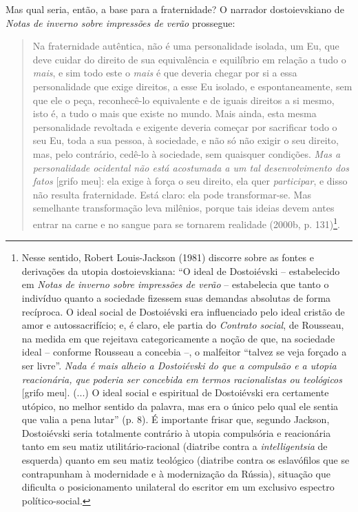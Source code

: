 Mas qual seria, então, a base para a fraternidade? O narrador
dostoievskiano de \emph{Notas de inverno sobre impressões de verão}
prossegue:

\begin{quote}
Na fraternidade autêntica, não é uma personalidade isolada, um Eu, que
deve cuidar do direito de sua equivalência e equilíbrio em relação a
tudo o \emph{mais}, e sim todo este o \emph{mais} é que deveria chegar
por si a essa personalidade que exige direitos, a esse Eu isolado, e
espontaneamente, sem que ele o peça, reconhecê-lo equivalente e de
iguais direitos a si mesmo, isto é, a tudo o mais que existe no mundo.
Mais ainda, esta mesma personalidade revoltada e exigente deveria
começar por sacrificar todo o seu Eu, toda a sua pessoa, à sociedade, e
não só não exigir o seu direito, mas, pelo contrário, cedê-lo à
sociedade, sem quaisquer condições. \emph{Mas a personalidade ocidental
não está acostumada a um tal desenvolvimento dos fatos} {[}grifo meu{]}:
ela exige à força o seu direito, ela quer \emph{participar}, e disso não
resulta fraternidade. Está claro: ela pode transformar-se. Mas
semelhante transformação leva milênios, porque tais ideias devem antes
entrar na carne e no sangue para se tornarem realidade (2000b, p.
131)\footnote{Nesse sentido, Robert Louis-Jackson (1981) discorre sobre
  as fontes e derivações da utopia dostoievskiana: ``O ideal de
  Dostoiévski -- estabelecido em \emph{Notas de inverno sobre impressões
  de verão} -- estabelecia que tanto o indivíduo quanto a sociedade
  fizessem suas demandas absolutas de forma recíproca. O ideal social de
  Dostoiévski era influenciado pelo ideal cristão de amor e
  autossacrifício; e, é claro, ele partia do \emph{Contrato social}, de
  Rousseau, na medida em que rejeitava categoricamente a noção de que,
  na sociedade ideal -- conforme Rousseau a concebia --, o malfeitor
  ``talvez se veja forçado a ser livre''. \emph{Nada é mais alheio a
  Dostoiévski do que a compulsão e a utopia reacionária, que poderia ser
  concebida em termos racionalistas ou teológicos} {[}grifo meu{]}.
  (...) O ideal social e espiritual de Dostoiévski era certamente
  utópico, no melhor sentido da palavra, mas era o único pelo qual ele
  sentia que valia a pena lutar'' (p. 8). É importante frisar que,
  segundo Jackson, Dostoiévski seria totalmente contrário à utopia
  compulsória e reacionária tanto em seu matiz utilitário-racional
  (diatribe contra a \emph{intelligentsia} de esquerda) quanto em seu
  matiz teológico (diatribe contra os eslavófilos que se contrapunham à
  modernidade e à modernização da Rússia), situação que dificulta o
  posicionamento unilateral do escritor em um exclusivo espectro
  político-social.}.
\end{quote}


